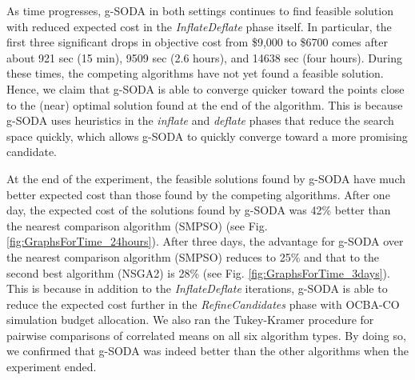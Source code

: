 \documentclass[a4paper, 12pt]{article} %
\begin{document}
As time progresses, g-SODA in both settings continues to find feasible solution with reduced expected cost in the \textit{InflateDeflate} phase itself. In particular, the first three significant drops in objective cost from \$9,000 to \$6700 comes after about 921 sec (15 min),  9509 sec (2.6 hours), and 14638 sec (four hours). During these times, the competing algorithms have not yet found a feasible solution.
Hence, we claim that g-SODA is able to converge quicker toward the points close to the (near) optimal solution found at the end of the algorithm. This is because g-SODA uses heuristics in the \textit{inflate} and \textit{deflate} phases that reduce the search space quickly, which allows g-SODA to quickly converge toward a more promising candidate. 

At the end of the experiment, the feasible solutions found by g-SODA  have much better expected cost than those found by the competing algorithms. After one day, the expected cost of the solutions found by g-SODA was 42\% better than the nearest comparison algorithm (SMPSO) (see Fig. \ref{fig:GraphsForTime_24hours}). After three days, the advantage for g-SODA over the nearest comparison algorithm (SMPSO) reduces to 25\% and that to the second best algorithm (NSGA2) is 28\% (see Fig. \ref{fig:GraphsForTime_3days}). This is because in addition to the \textit{InflateDeflate} iterations, g-SODA is able to reduce the expected cost further in the \textit{RefineCandidates} phase with OCBA-CO simulation budget allocation. 
We also ran the Tukey-Kramer procedure for pairwise comparisons of correlated means on all six algorithm types. By doing so, we confirmed that g-SODA was indeed better than the other algorithms when the experiment ended.
\end{document}

